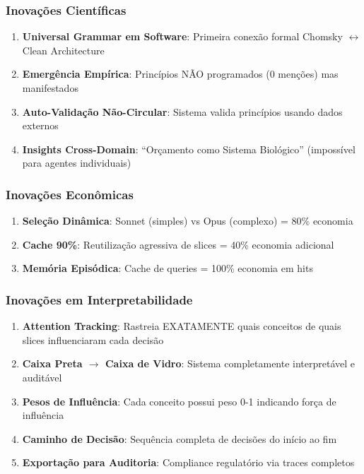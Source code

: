 \documentclass[11pt]{article}
\begin{document}
\subsubsection{Inovações Científicas}

\begin{enumerate}
    \item \textbf{Universal Grammar em Software}: Primeira conexão formal Chomsky $\leftrightarrow$ Clean Architecture
    \item \textbf{Emergência Empírica}: Princípios NÃO programados (0 menções) mas manifestados
    \item \textbf{Auto-Validação Não-Circular}: Sistema valida princípios usando dados externos
    \item \textbf{Insights Cross-Domain}: ``Orçamento como Sistema Biológico'' (impossível para agentes individuais)
\end{enumerate}

\subsubsection{Inovações Econômicas}

\begin{enumerate}
    \item \textbf{Seleção Dinâmica}: Sonnet (simples) vs Opus (complexo) = 80\% economia
    \item \textbf{Cache 90\%}: Reutilização agressiva de slices = 40\% economia adicional
    \item \textbf{Memória Episódica}: Cache de queries = 100\% economia em hits
\end{enumerate}

\subsubsection{Inovações em Interpretabilidade}

\begin{enumerate}
    \item \textbf{Attention Tracking}: Rastreia EXATAMENTE quais conceitos de quais slices influenciaram cada decisão
    \item \textbf{Caixa Preta $\rightarrow$ Caixa de Vidro}: Sistema completamente interpretável e auditável
    \item \textbf{Pesos de Influência}: Cada conceito possui peso 0-1 indicando força de influência
    \item \textbf{Caminho de Decisão}: Sequência completa de decisões do início ao fim
    \item \textbf{Exportação para Auditoria}: Compliance regulatório via traces completos
\end{enumerate}
\end{document}
